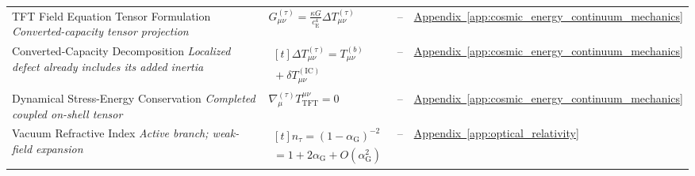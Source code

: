 \begin{longtable}{@{} p{4.5cm} p{6cm} c p{4cm} @{}}
{\raggedright TFT Field Equation Tensor Formulation \newline \textit{Converted-capacity tensor projection}\par} & {\raggedright $G_{\mu\nu}^{(\tau)} = \frac{\kappa G}{c_{\mathrm{E}}^4} \Delta T_{\mu\nu}^{(\tau)}$\par} & -- & {\raggedright \hyperref[app:cosmic_energy_continuum_mechanics]{Appendix~\ref*{app:cosmic_energy_continuum_mechanics}}\par} \\

{\raggedright Converted-Capacity Decomposition \newline \textit{Localized defect already includes its added inertia}\par} & {\raggedright $\begin{gathered}[t]\Delta T_{\mu\nu}^{(\tau)}=T_{\mu\nu}^{(b)} \\ {}+\delta T_{\mu\nu}^{(\mathrm{IC})}\end{gathered}$\par} & -- & {\raggedright \hyperref[app:cosmic_energy_continuum_mechanics]{Appendix~\ref*{app:cosmic_energy_continuum_mechanics}}\par} \\

{\raggedright Dynamical Stress-Energy Conservation \newline \textit{Completed coupled on-shell tensor}\par} & {\raggedright $\nabla_\mu^{(\tau)}T_{\mathrm{TFT}}^{\mu\nu}=0$\par} & -- & {\raggedright \hyperref[app:cosmic_energy_continuum_mechanics]{Appendix~\ref*{app:cosmic_energy_continuum_mechanics}}\par} \\

{\raggedright Vacuum Refractive Index \newline \textit{Active branch; weak-field expansion}\par} & {\raggedright $\begin{gathered}[t]n_\tau=(1-\alpha_{\mathrm G})^{-2} \\ =1+2\alpha_{\mathrm G}+O(\alpha_{\mathrm G}^2)\end{gathered}$\par} & -- & {\raggedright \hyperref[app:optical_relativity]{Appendix~\ref*{app:optical_relativity}}\par} \\


\end{longtable}
